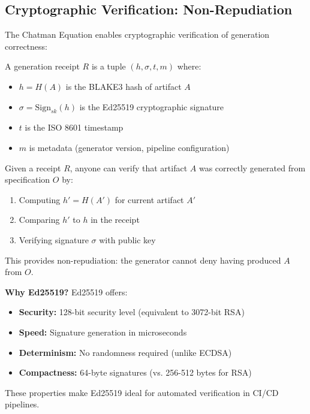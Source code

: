\subsection{Cryptographic Verification: Non-Repudiation}

The Chatman Equation enables cryptographic verification of generation correctness:

\begin{definition}
    A generation receipt \(R\) is a tuple \((h, \sigma, t, m)\) where:
    \begin{itemize}
        \item \(h = H(A)\) is the BLAKE3 hash of artifact \(A\)
        \item \(\sigma = \text{Sign}_{sk}(h)\) is the Ed25519 cryptographic signature
        \item \(t\) is the ISO 8601 timestamp
        \item \(m\) is metadata (generator version, pipeline configuration)
    \end{itemize}
\end{definition}

Given a receipt \(R\), anyone can verify that artifact \(A\) was correctly generated from specification \(O\) by:
\begin{enumerate}
    \item Computing \(h' = H(A')\) for current artifact \(A'\)
    \item Comparing \(h'\) to \(h\) in the receipt
    \item Verifying signature \(\sigma\) with public key
\end{enumerate}

This provides non-repudiation: the generator cannot deny having produced \(A\) from \(O\).

\textbf{Why Ed25519?} Ed25519 offers:
\begin{itemize}
    \item \textbf{Security:} 128-bit security level (equivalent to 3072-bit RSA)
    \item \textbf{Speed:} Signature generation in microseconds
    \item \textbf{Determinism:} No randomness required (unlike ECDSA)
    \item \textbf{Compactness:} 64-byte signatures (vs. 256-512 bytes for RSA)
\end{itemize}

These properties make Ed25519 ideal for automated verification in CI/CD pipelines.


